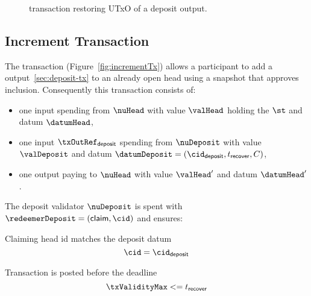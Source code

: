 \begin{figure}
  \centering
  
  \caption{\mtxRecover{} transaction restoring UTxO of a deposit
	output.}\label{fig:recoverTx}
\end{figure}

\subsection{Increment Transaction}\label{sec:increment-tx}

\noindent The \mtxIncrement{} transaction (Figure~\ref{fig:incrementTx}) allows
a participant to add a \mtxDeposit{} output~\ref{sec:deposit-tx} to an already
open head using a snapshot that approves inclusion. Consequently this
transaction consists of:

\begin{itemize}
  \item one input spending from $\nuHead$ with value $\valHead$ holding the
        $\st$ and datum $\datumHead$,
  \item one input $\txOutRef_{\mathsf{deposit}}$ spending from $\nuDeposit$ with value $\valDeposit$ and datum
        $\datumDeposit = (\cid_{\mathsf{deposit}}, t_{\mathsf{recover}}, C)$,
  \item one output paying to $\nuHead$ with value $\valHead'$ and datum
        $\datumHead'$.
\end{itemize}

\noindent The deposit validator $\nuDeposit$ is spent with
$\redeemerDeposit = (\mathsf{claim}, \mathsf{\cid})$ and ensures:
\begin{menumerate}
  \item Claiming head id matches the deposit datum
  \[
    \cid = \cid_{\mathsf{deposit}}
  \]
  \item Transaction is posted before the deadline
  \[
    \txValidityMax <= t_{\mathsf{recover}}
  \]
\end{menumerate}

